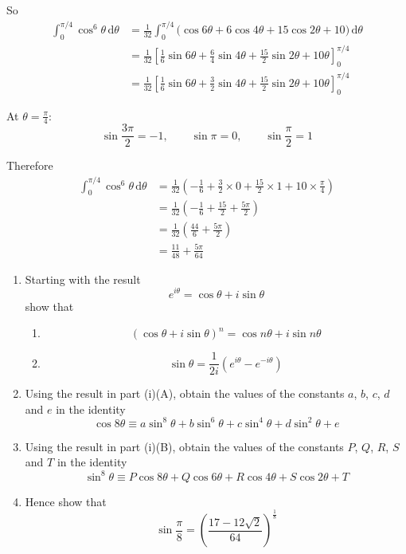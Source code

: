 \documentclass[leqno]{article}
\begin{document}
\begin{enumerate}[
  label=\textbf{\arabic*.},
  leftmargin=*,
  topsep=0pt,
  partopsep=0pt,
  parsep=0pt
]
\begin{djsSolution}
\begin{enumerate}[label=\textbf{(\alph*)}]
  So
  \begin{align*}
  \int_0^{\pi/4}\cos^6\theta\,\mathrm{d}\theta
  &=\frac{1}{32}\int_0^{\pi/4}\bigl(\cos 6\theta+6\cos 4\theta+15\cos 2\theta+10\bigr)\,\mathrm{d}\theta \\
  &=\frac{1}{32}\left[\frac{1}{6}\sin 6\theta+\frac{6}{4}\sin 4\theta+\frac{15}{2}\sin 2\theta+10\theta\right]_0^{\pi/4} \\
  &=\frac{1}{32}\left[\frac{1}{6}\sin 6\theta+\frac{3}{2}\sin 4\theta+\frac{15}{2}\sin 2\theta+10\theta\right]_0^{\pi/4}
  \end{align*}

  At \(\theta=\frac{\pi}{4}\):
  \[
  \sin\frac{3\pi}{2}=-1,\qquad \sin\pi=0,\qquad \sin\frac{\pi}{2}=1
  \]

  Therefore
  \begin{align*}
  \int_0^{\pi/4}\cos^6\theta\,\mathrm{d}\theta
  &=\frac{1}{32}\left(-\frac{1}{6}+\frac{3}{2}\times 0+\frac{15}{2}\times 1+10\times\frac{\pi}{4}\right) \\
  &=\frac{1}{32}\left(-\frac{1}{6}+\frac{15}{2}+\frac{5\pi}{2}\right) \\
  &=\frac{1}{32}\left(\frac{44}{6}+\frac{5\pi}{2}\right) \\
  &=\frac{11}{48}+\frac{5\pi}{64}
  \end{align*}
\end{enumerate}
\end{djsSolution}


\newpage

\questionitem

\begin{enumerate}[label=\textbf{(\roman*)}]
  \item Starting with the result
  \[
  e^{i\theta}=\cos\theta+i\sin\theta
  \]
  show that
  \begin{enumerate}[label=(\Alph*)]
    \item
    \[
    \left(\cos\theta+i\sin\theta\right)^n=\cos n\theta+i\sin n\theta
    \]
    \item
    \[
    \sin\theta=\frac{1}{2i}\left(e^{i\theta}-e^{-i\theta}\right)
    \]
  \end{enumerate}
  \item Using the result in part (i)(A), obtain the values of the constants $a$, $b$, $c$, $d$ and $e$ in the identity
  \[
  \cos 8\theta \equiv a\sin^8\theta+b\sin^6\theta+c\sin^4\theta+d\sin^2\theta+e
  \]
  \item Using the result in part (i)(B), obtain the values of the constants $P$, $Q$, $R$, $S$ and $T$ in the identity
  \[
  \sin^8\theta \equiv P\cos 8\theta+Q\cos 6\theta+R\cos 4\theta+S\cos 2\theta+T
  \]
  \item Hence show that
  \[
  \sin \frac{\pi}{8}=\left(\frac{17-12\sqrt{2}}{64}\right)^{\frac{1}{8}}
  \]
\end{enumerate}


\end{enumerate}
\end{document}
